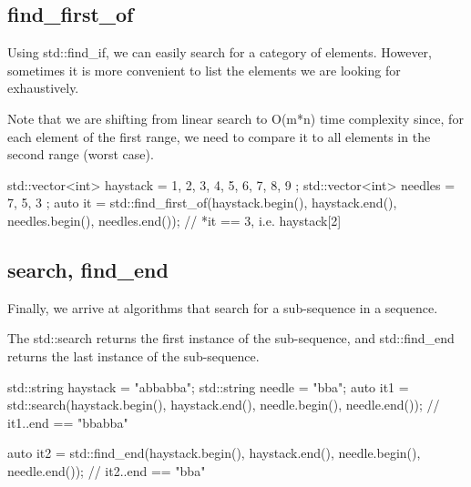 \subsection{find\_first\_of}

Using std::find\_if, we can easily search for a category of elements. However, sometimes it is more convenient to list the elements we are looking for exhaustively.



Note that we are shifting from linear search to O(m*n) time complexity since, for each element of the first range, we need to compare it to all elements in the second range (worst case).

\begin{box-note}
\begin{cppcode}
std::vector<int> haystack = { 1, 2, 3, 4, 5, 6, 7, 8, 9 };
std::vector<int> needles = { 7, 5, 3 };
auto it = std::find_first_of(haystack.begin(), haystack.end(), 
                             needles.begin(), needles.end());
// *it == 3, i.e. haystack[2]
\end{cppcode}
\end{box-note}

\subsection{search, find\_end}

Finally, we arrive at algorithms that search for a sub-sequence in a sequence.



The std::search returns the first instance of the sub-sequence, and std::find\_end returns the last instance of the sub-sequence.

\begin{box-note}
\begin{cppcode}
std::string haystack = "abbabba";
std::string needle = "bba";
auto it1 = std::search(haystack.begin(), haystack.end(), 
                       needle.begin(), needle.end());
// it1..end == "bbabba"

auto it2 = std::find_end(haystack.begin(), haystack.end(), 
                         needle.begin(), needle.end());
// it2..end == "bba"
\end{cppcode}
\end{box-note}

